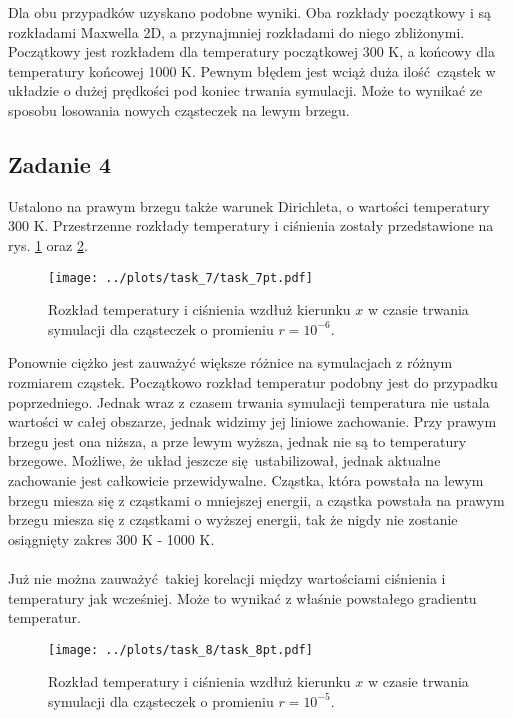 \documentclass[a4paper, 12pt]{article}
\begin{document}
	\noindent Dla obu przypadków uzyskano podobne wyniki. 
	Oba rozkłady początkowy i są rozkładami Maxwella 2D, a przynajmniej rozkładami do niego zbliżonymi.
	Początkowy jest rozkładem dla temperatury początkowej 300 K, a końcowy dla temperatury końcowej 1000 K.
	Pewnym błędem jest wciąż duża ilość cząstek w układzie o dużej prędkości pod koniec trwania symulacji.
	Może to wynikać ze sposobu losowania nowych cząsteczek na lewym brzegu. 
	
	\subsection*{Zadanie 4}
	
	Ustalono na prawym brzegu także warunek Dirichleta, o wartości temperatury 300 K.
	Przestrzenne rozkłady temperatury i ciśnienia zostały przedstawione na rys. \ref{pt_t7} oraz \ref{pt_t8}.
	
	\begin{figure}[H]
		\centering
		\texttt{[image: ../plots/task\_7/task\_7pt.pdf]}
		\caption{Rozkład temperatury i ciśnienia wzdłuż kierunku $x$ w czasie trwania symulacji dla cząsteczek o promieniu $r=10^{-6}$.}
		\label{pt_t7}
	\end{figure}
	
	\noindent Ponownie ciężko jest zauważyć większe różnice na symulacjach z różnym rozmiarem cząstek.
	Początkowo rozkład temperatur podobny jest do przypadku poprzedniego. 
	Jednak wraz z czasem trwania symulacji temperatura nie ustala wartości w całej obszarze, jednak widzimy jej liniowe zachowanie.
	Przy prawym brzegu jest ona niższa, a prze lewym wyższa, jednak nie są to temperatury brzegowe.
	Możliwe, że układ jeszcze się ustabilizował, jednak aktualne zachowanie jest całkowicie przewidywalne.
	Cząstka, która powstała na lewym brzegu miesza się z cząstkami o mniejszej energii, a cząstka powstała na prawym brzegu miesza się z cząstkami o wyższej energii, tak że nigdy nie zostanie osiągnięty zakres 300 K - 1000 K. 
	\\
	\\
	Już nie można zauważyć takiej korelacji między wartościami ciśnienia i temperatury jak wcześniej. 
	Może to wynikać z właśnie powstałego gradientu temperatur. 
	
	\begin{figure}[H]
		\centering
		\texttt{[image: ../plots/task\_8/task\_8pt.pdf]}
		\caption{Rozkład temperatury i ciśnienia wzdłuż kierunku $x$ w czasie trwania symulacji dla cząsteczek o promieniu $r=10^{-5}$.}
		\label{pt_t8}
	\end{figure}
	
\end{document}

